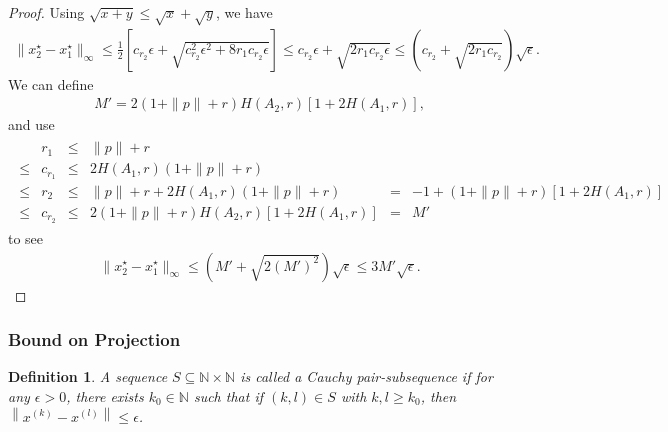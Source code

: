 \documentclass{article}
\newtheorem{definition}[theorem]{Definition}
\theoremstyle{case}
\numberwithin{theorem}{subsection}
\newcommand{\naturals}{\mathbb N}
\newcommand{\xk}{x^{(k)}}
\newcommand{\xl}{{x^{(l)}}}
\begin{document}
\begin{proof}
Using $\sqrt{x + y} \le \sqrt{x} + \sqrt{y}$, we have
\begin{align*}
\|x_2^{\star} - x_1^{\star}\|_{\infty} \le \frac 1 2 \left[c_{r_2}\epsilon + \sqrt{c_{r_2}^2\epsilon^2 + 8r_1c_{r_2}\epsilon}\right] 
\le c_{r_2}\epsilon + \sqrt{2r_1c_{r_2}\epsilon}
\le \left(c_{r_2} + \sqrt{2r_1c_{r_2}}\right)\sqrt{\epsilon}.
\end{align*}
We can define 
\begin{align*}
M' = 2 \left(1 + \|p\| + r\right) H\left(A_2, r\right) \left[1 + 2H(A_1, r)\right],
\end{align*}
and use
\begin{align*}
\begin{array}{cccccl}
& r_1     &\le& \|p\| + r 													& &	\\
\le & c_{r_1} &\le& 2H\left(A_1, r\right)\left(1 + \|p\| + r\right) 				& &	\\
\le & r_2     &\le&  \|p\| + r + 2H\left(A_1, r\right)\left(1 + \|p\| + r\right) 	&=&-1 + \left(1 + \|p\| + r\right)\left[1 + 2H(A_1, r)\right]\\
\le & c_{r_2} &\le& 2 \left(1 + \|p\| + r\right) H\left(A_2, r\right) \left[1 + 2H(A_1, r)\right] &=& M'
\end{array}
\end{align*}
to see
\begin{align*}
\|x_2^{\star} - x_1^{\star}\|_{\infty} \le \left(M' + \sqrt{2\left(M'\right)^2}\right)\sqrt{\epsilon} \le 3M'\sqrt{\epsilon}.
\end{align*}

\end{proof}




\subsubsection{Bound on Projection}


\begin{definition}
\label{criteria_from_contradiction}
A sequence $S \subseteq\naturals \times \naturals$ is called a \emph{Cauchy pair-subsequence} if
for any $\epsilon > 0$, there exists $k_0 \in \naturals$ such that if $(k, l) \in S$ with $k, l \ge k_0$, 
then 
$\left\|\xk - \xl \right\| \le \epsilon$.
\end{definition}
\end{document}
